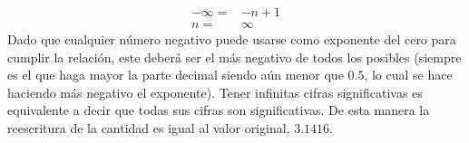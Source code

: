\documentclass[12pt]{article}
\begin{document}
\begin{enumerate}[leftmargin=*,widest=9]
\begin{enumerate}[label=\alph*]
\begin{eqnarray*}
	 -\infty = &-n + 1\\
	 n = &\infty
	 \end{eqnarray*}
	 Dado que cualquier número negativo puede usarse como exponente del cero para cumplir la relación, este deberá ser el más negativo de todos los posibles (siempre es el que haga mayor la parte decimal siendo aún menor que \(0.5\), lo cual se hace haciendo más negativo el exponente).
	 Tener infinitas cifras significativas es equivalente a decir que todas sus cifras son significativas. De esta manera la reescritura de la cantidad es igual al valor original, \(3.1416\).
   \end{enumerate}
\end{enumerate}
\end{document}
